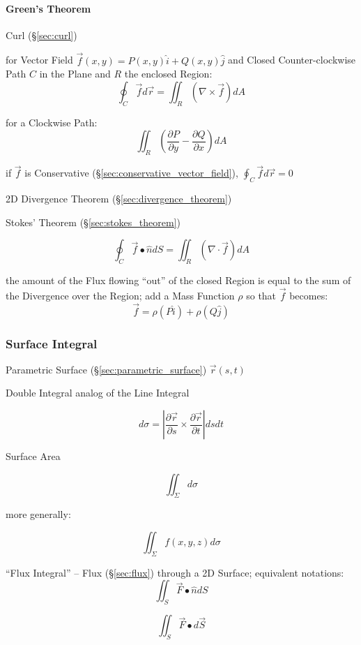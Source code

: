 \paragraph{Green's Theorem}\label{sec:greens_theorem}\hfill

Curl (\S\ref{sec:curl})

for Vector Field $\vec{f}(x,y) = P(x,y)\hat{i} + Q(x,y)\hat{j}$ and Closed
Counter-clockwise Path $C$ in the Plane and $R$ the enclosed Region:
\[
  \oint_C \vec{f} d\vec{r} = \iint_R (\nabla \times \vec{f}) dA
\]

for a Clockwise Path:
\[
  \iint_R (\frac{\partial{P}}{\partial{y}} - \frac{\partial{Q}}{\partial{x}}) dA
\]

if $\vec{f}$ is Conservative (\S\ref{sec:conservative_vector_field}), $\oint_C
\vec{f} d\vec{r} = 0$

\fist 2D Divergence Theorem (\S\ref{sec:divergence_theorem})

\fist Stokes' Theorem (\S\ref{sec:stokes_theorem})

\[
  \oint_C \vec{f} \bullet \hat{n} dS = \iint_R (\nabla \cdot \vec{f}) dA
\]

the amount of the Flux flowing ``out'' of the closed Region is equal to the sum
of the Divergence over the Region; add a Mass Function $\rho$ so that $\vec{f}$
becomes:
\[
  \vec{f} = \rho(P\hat{i}) + \rho(Q\hat{j})
\]



\subsubsection{Surface Integral}\label{sec:surface_integral}

Parametric Surface (\S\ref{sec:parametric_surface})
$\vec{r}(s,t)$

Double Integral analog of the Line Integral

\[
  d\sigma =
    |\frac{\partial{\vec{r}}}{\partial{s}}
      \times \frac{\partial{\vec{r}}}{\partial{t}}| ds dt
\]

Surface Area

\[
  {\iint}_{\Sigma} d\sigma
\]

more generally:

\[
  {\iint}_{\Sigma} f(x,y,z) d\sigma
\]

``Flux Integral'' -- Flux (\S\ref{sec:flux}) through a 2D Surface; equivalent
notations:
\[
  \iint_{S} \vec{F} \bullet \hat{n} dS
\]

\[
  \iint_{S} \vec{F} \bullet d\vec{S}
\]

